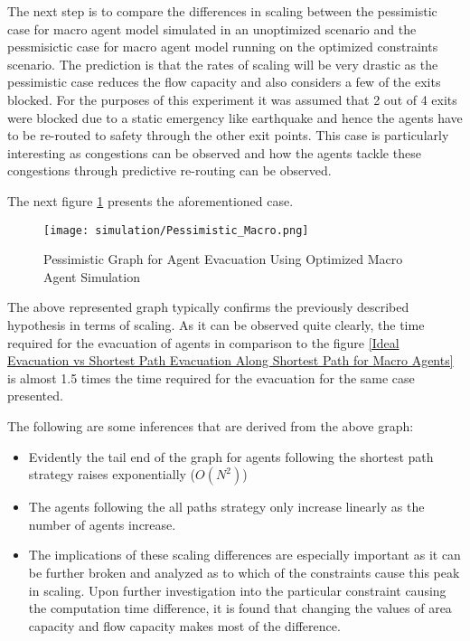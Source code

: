 The next step is to compare the differences in scaling between the pessimistic case for  macro agent model simulated in an unoptimized scenario and the pessmisictic case for macro agent model running on the optimized constraints scenario. The prediction is that the rates of scaling will be very drastic as the pessimistic case reduces the flow capacity and also considers a few of the exits blocked. For the purposes of this experiment it was assumed that 2 out of 4 exits were blocked due to a static emergency like earthquake and hence the agents have to be re-routed to safety through the other exit points. This case is particularly interesting as congestions can be observed and how the agents tackle these congestions through predictive re-routing can be observed. 

The next figure \ref{Pessimistic Graph for Agent Evacuation Using Optimized Macro Agent Simulation} presents the aforementioned case.

\begin{figure}[H]
  \centering
  \texttt{[image: simulation/Pessimistic\_Macro.png]}
  \caption{Pessimistic Graph for Agent Evacuation Using Optimized Macro Agent Simulation}
  \label{Pessimistic Graph for Agent Evacuation Using Optimized Macro Agent Simulation}
\end{figure}


The above represented graph typically confirms the previously described hypothesis in terms of scaling. As it can be observed quite clearly, the time required for the evacuation of agents in comparison to the figure \ref{Ideal Evacuation vs Shortest Path Evacuation Along Shortest Path for Macro Agents} is almost 1.5 times the time required for the evacuation for the same case presented.

The following are some inferences that are derived from the above graph:

\begin{itemize}
  \item Evidently the tail end of the graph for agents following the shortest path strategy raises exponentially ($O(N^2)$)
  \item The agents following the all paths strategy only increase linearly as the number of agents increase.
  \item The implications of these scaling differences are especially important as it can be further broken and analyzed as to which of the constraints cause this peak in scaling. Upon further investigation into the particular constraint causing the computation time difference, it is found that changing the values of area capacity and flow capacity makes most of the difference.
\end{itemize}


